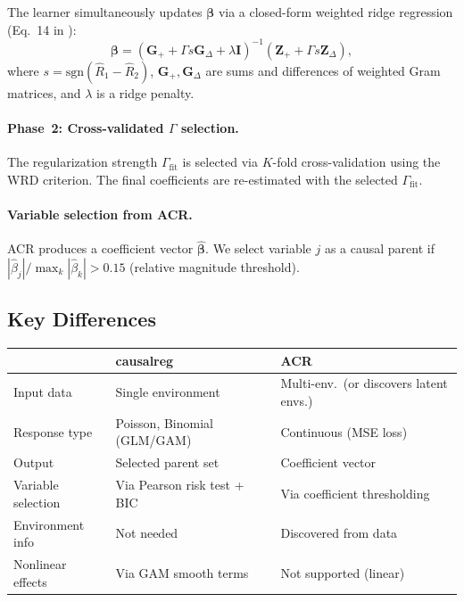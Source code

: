 \documentclass[11pt,a4paper]{article}
\begin{document}
The learner simultaneously updates $\boldsymbol{\beta}$ via a closed-form weighted ridge regression (Eq.~14 in \citealt{richter2026}):
\begin{equation}
\boldsymbol{\beta} = (\mathbf{G}_+ + \Gamma s \mathbf{G}_\Delta + \lambda \mathbf{I})^{-1}(\mathbf{Z}_+ + \Gamma s \mathbf{Z}_\Delta),
\end{equation}
where $s = \text{sgn}(\hat{R}_1 - \hat{R}_2)$, $\mathbf{G}_+, \mathbf{G}_\Delta$ are sums and differences of weighted Gram matrices, and $\lambda$ is a ridge penalty.

\paragraph{Phase~2: Cross-validated $\Gamma$ selection.} The regularization strength $\Gamma_{\text{fit}}$ is selected via $K$-fold cross-validation using the WRD criterion. The final coefficients are re-estimated with the selected $\Gamma_{\text{fit}}$.

\paragraph{Variable selection from ACR.} ACR produces a coefficient vector $\hat{\boldsymbol{\beta}}$. We select variable $j$ as a causal parent if $|\hat{\beta}_j| / \max_k |\hat{\beta}_k| > 0.15$ (relative magnitude threshold).

\subsection{Key Differences}

\begin{center}
\begin{tabular}{lll}
\toprule
& \textbf{causalreg} & \textbf{ACR} \\
\midrule
Input data & Single environment & Multi-env.\ (or discovers latent envs.) \\
Response type & Poisson, Binomial (GLM/GAM) & Continuous (MSE loss) \\
Output & Selected parent set & Coefficient vector \\
Variable selection & Via Pearson risk test + BIC & Via coefficient thresholding \\
Environment info & Not needed & Discovered from data \\
Nonlinear effects & Via GAM smooth terms & Not supported (linear) \\
\bottomrule
\end{tabular}
\end{center}
\end{document}
